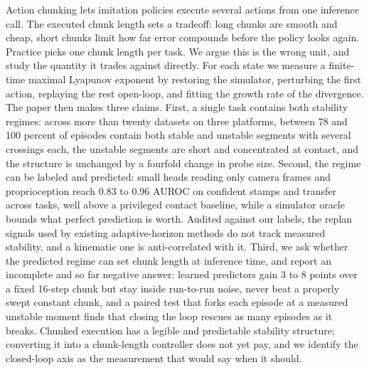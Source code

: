 Action chunking lets imitation policies execute several actions from one
inference call. The executed chunk length sets a tradeoff: long chunks are
smooth and cheap, short chunks limit how far error compounds before the policy
looks again. Practice picks one chunk length per task. We argue this is the
wrong unit, and study the quantity it trades against directly. For each state
we measure a finite-time maximal Lyapunov exponent by restoring the simulator,
perturbing the first action, replaying the rest open-loop, and fitting the
growth rate of the divergence. The paper then makes three claims. First, a
single task contains both stability regimes: across more than twenty datasets
on three platforms, between 78 and 100 percent of episodes contain both stable
and unstable segments with several crossings each, the unstable segments are
short and concentrated at contact, and the structure is unchanged by a
fourfold change in probe size. Second, the regime can be labeled and predicted:
small heads reading only camera frames and proprioception reach 0.83 to 0.96
AUROC on confident stamps and transfer across tasks, well above a privileged
contact baseline, while a simulator oracle bounds what perfect prediction is
worth. Audited against our labels, the replan signals used by existing
adaptive-horizon methods do not track measured stability, and a kinematic one
is anti-correlated with it. Third, we ask whether the predicted regime can set
chunk length at inference time, and report an incomplete and so far negative
answer: learned predictors gain 3 to 8 points over a fixed 16-step chunk but
stay inside run-to-run noise, never beat a properly swept constant chunk, and a
paired test that forks each episode at a measured unstable moment finds that
closing the loop rescues as many episodes as it breaks. Chunked execution has a
legible and predictable stability structure; converting it into a chunk-length
controller does not yet pay, and we identify the closed-loop axis as the
measurement that would say when it should.
